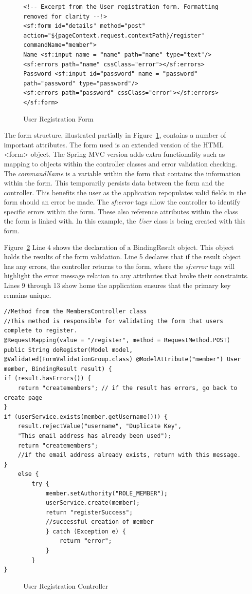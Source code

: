 \begin{figure}[H]
\begin{lstlisting}
<!-- Excerpt from the User registration form. Formatting removed for clarity --!>
<sf:form id="details" method="post" action="${pageContext.request.contextPath}/register" commandName="member">
Name <sf:input name = "name" path="name" type="text"/>
<sf:errors path="name" cssClass="error"></sf:errors>
Password <sf:input id="password" name = "password" path="password" type="password"/>
<sf:errors path="password" cssClass="error"></sf:errors>
</sf:form>
\end{lstlisting}
\caption{User Registration Form}
\label{fig:memberForm}
\end{figure}

The form structure, illustrated partially in Figure~\ref{fig:memberForm}, contains a number of important attributes. The form used is an extended version of the HTML <form> object. The Spring MVC version adds extra functionality such as mapping to objects within the controller classes and error validation checking. The \textit{commandName} is a variable within the form that contains the information within the form. This temporarily persists data between the form and the controller. This benefits the user as the application repopulates valid fields in the form should an error be made. The \textit{sf:error} tags allow the controller to identify specific errors within the form. These also reference attributes within the class the form is linked with. In this example, the \textit{User} class is being created with this form. 

Figure~\ref{fig:memberController} Line 4 shows the declaration of a BindingResult object. This object holds the results of the form validation. Line 5 declares that if the result object has any errors, the controller returns to the form, where the \textit{sf:error} tags will highlight the error message relation to any attributes that broke their constraints. Lines 9 through 13 show home the application ensures that the primary key remains unique. 

\begin{lstlisting}
//Method from the MembersController class
//This method is responsible for validating the form that users complete to register.
@RequestMapping(value = "/register", method = RequestMethod.POST)
public String doRegister(Model model,
@Validated(FormValidationGroup.class) @ModelAttribute("member") User member, BindingResult result) {
if (result.hasErrors()) {
	return "createmembers"; // if the result has errors, go back to create page
}
if (userService.exists(member.getUsername())) {
	result.rejectValue("username", "Duplicate Key",
	"This email address has already been used");
	return "createmembers";
	//if the email address already exists, return with this message.
}
	else {
		try {
			member.setAuthority("ROLE_MEMBER");
			userService.create(member);
			return "registerSuccess";
			//successful creation of member
			} catch (Exception e) {
				return "error";
			}
		}
}
\end{lstlisting}
\begin{figure}[H]
\caption{User Registration Controller}
\label{fig:memberController}
\end{figure}

